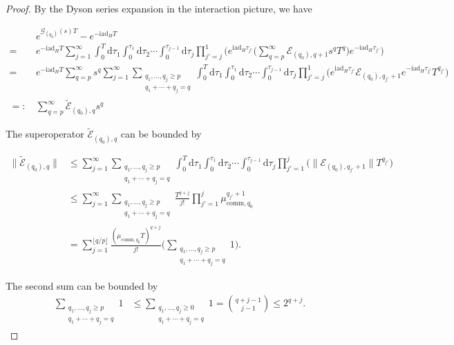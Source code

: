 \documentclass[aps,pra,reprint,groupedaddress,floatfix]{revtex4-2}
\renewcommand{\i}{\mathrm{i}}
\renewcommand{\d}{\mathrm{d}}
\newcommand{\ad}{\mathrm{ad}}
\newcommand{\G}{\mathcal{G}}
\newcommand{\E}{\mathcal{E}}
\begin{document}
\begin{proof}
	By the Dyson series expansion in the interaction picture, we have 
    \begin{widetext}
	\begin{align*}
    &e^{\G_{(q_0)}(s) T}-e^{-\i \ad_H T} \\
    = \ & e^{-\i \ad_H T}  \sum_{j=1}^{\infty} \int_{0}^T \d \tau_1 \int_{0}^{\tau_1}\d \tau_2 \cdots \int_{0}^{\tau_{j-1}}\d \tau_j \prod_{j'=j}^{1}\bigg(e^{\i\ad_H \tau_{j'}}\bigg(\sum_{q=p}^{\infty}\E_{(q_0),q+1}s^qT^q\bigg)e^{-\i \ad_H \tau_{j'}}\bigg) \\
    = \ &  e^{-\i \ad_H T}\sum_{q=p}^{\infty}s^{q} \sum_{j=1}^{\infty} \sum_{\substack{q_1,\ldots,q_j \ge p \\ q_1+\cdots+q_j=q}} \int_{0}^T \d \tau_1 \int_{0}^{\tau_1}\d \tau_2 \cdots \int_{0}^{\tau_{j-1}}\d \tau_j \prod_{j'=j}^{1}\bigg(e^{\i\ad_H \tau_{j'}}\E_{(q_0),q_{j'}+1}e^{-\i \ad_H \tau_{j'}}T^{q_{j'}}\bigg)\\
    =:\,& \sum_{q=p}^{\infty}\tilde{\E}_{(q_0),q} s^q   
	\end{align*}
    \end{widetext}
	The superoperator $\tilde{\E}_{(q_0),q}$ can be bounded by
    \begin{widetext}
    \begin{align*}
    \big\|\tilde{\E}_{(q_0),q}\big\|&\le \sum_{j=1}^{\infty} \sum_{\substack{q_1,\ldots,q_j \ge p \\ q_1+\cdots+q_j=q}} \int_{0}^T \d \tau_1 \int_{0}^{\tau_1}\d \tau_2 \cdots \int_{0}^{\tau_{j-1}}\d \tau_j \prod_{j'=1}^{j}\big(\big\|\E_{(q_0),q_{j'}+1}\big\|T^{q_{j'}}\big) \\
    &\le  \sum_{j=1}^{\infty} \sum_{\substack{q_1,\ldots,q_j \ge p \\ q_1+\cdots+q_j=q}}\frac{T^{q+j}}{j!}\prod_{j'=1}^{j}\mu_{\mathrm{comm},q_0}^{q_{j'}+1} \\
	    &=\sum_{j=1}^{\lfloor q/p\rfloor }\frac{(\mu_{\mathrm{comm},q_0}T)^{q+j}}{j!}\Big(\sum_{\substack{q_1,\ldots,q_j \ge p \\ q_1+\cdots+q_j=q}} 1\Big).
	\end{align*}
    \end{widetext}
The second sum can be bounded by \begin{align*}
    \sum_{\substack{q_1,\ldots,q_j \ge p \\ q_1+\cdots+q_j=q}} 1 &\le \sum_{\substack{ q_1,\ldots,q_j \ge 0 \\ q_1+\cdots+q_j=q}} 1=\binom{q+j-1}{j-1} \le 2^{q+j}.

\end{align*}
\end{proof}
\end{document}
